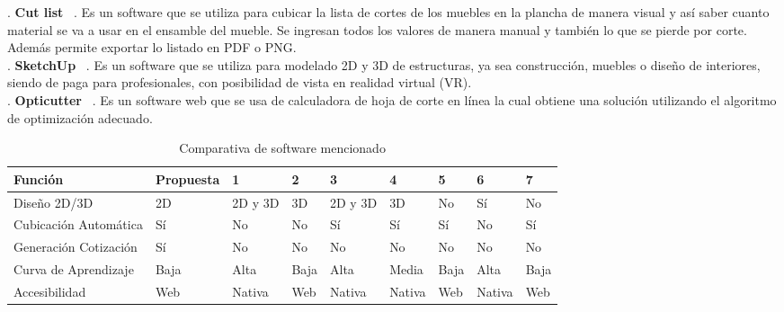 ﻿\documentclass{iccmemoria}
\begin{document}
. \textbf{Cut list} ~\cite{CutList}. Es un software que se utiliza para cubicar la lista de cortes de los muebles en la plancha de manera visual y así saber cuanto material se va a usar en el ensamble del mueble. Se ingresan todos los valores de manera manual y también lo que se pierde por corte. Además permite exportar lo listado en PDF o PNG.\\ 

. \textbf{SketchUp} ~\cite{SketchUp}. Es un software que se utiliza para modelado 2D y 3D de estructuras, ya sea cons\-trucción, muebles o diseño de interiores, siendo de paga para profesionales, con posibilidad de vista en realidad virtual (VR).\\

. \textbf{Opticutter} ~\cite{OptiCutter}. Es un software web que se usa de calculadora de hoja de corte en línea la cual obtiene una solución utilizando el algoritmo de optimización adecuado. 
\endgroup

\begin{table}[H]
    \centering
    \caption{Comparativa de software mencionado}
    \label{tab:comparativa_software} 
    
    \begin{tabular}{|p{2.2cm}|p{2cm}|p{1cm}|p{1cm}|p{1cm}|p{1cm}|p{1cm}|p{1cm}|p{1cm}|} 
        \hline %
        
        \textbf{Función} & \textbf{Propuesta} & \textbf{1}  & \textbf{2} & \textbf{3} & \textbf{4} & \textbf{5} & \textbf{6} & \textbf{7}\\
        \hline %
        
       Diseño 2D/3D & 2D & 2D y 3D & 3D & 2D y 3D & 3D & No & Sí & No\\
       \hline
       Cubicación Automática & Sí & No & No & Sí & Sí & Sí & No & Sí\\
       \hline
       Generación Cotización & Sí & No & No & No & No & No & No & No\\ 
       \hline
       Curva de Aprendizaje & Baja & Alta & Baja & Alta & Media & Baja & Alta & Baja\\
       \hline
       Accesibilidad  & Web  & Nativa & Web & Nativa & Nativa & Web & Nativa & Web\\
        
        \hline %
    \end{tabular}
\end{table}
\end{document}
